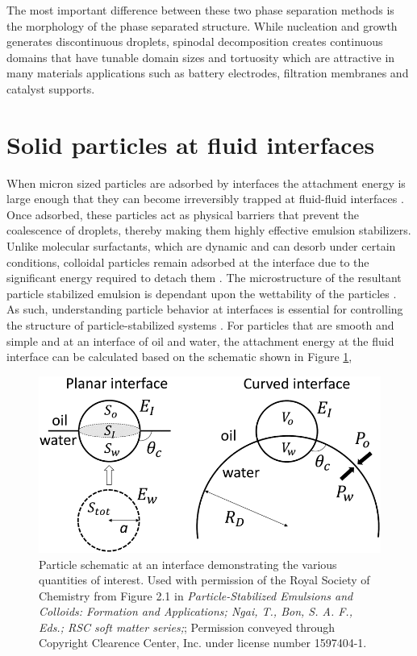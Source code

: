 The most important difference between these two phase separation methods is the morphology of the phase separated structure. While nucleation and growth generates discontinuous droplets,
spinodal decomposition creates continuous domains that have tunable domain sizes and tortuosity which are attractive in many materials applications such as battery electrodes, filtration
membranes and catalyst supports.

\section{Solid particles at fluid interfaces}

When micron sized particles are adsorbed by interfaces the attachment energy is large enough that they can become irreversibly trapped at fluid-fluid interfaces 
\cite{ngai_particle-stabilized_2015}. Once adsorbed, these particles act as physical barriers that prevent the coalescence of droplets, thereby making them highly effective 
emulsion stabilizers. Unlike molecular surfactants, which are dynamic and can desorb under certain conditions, colloidal particles remain adsorbed at the interface due to the 
significant energy required to detach them \cite{ngai_particle-stabilized_2015}. The microstructure of the resultant particle stabilized emulsion is dependant upon the wettability 
of the particles \cite{ngai_particle-stabilized_2015,velankar_non-equilibrium_2015}.
As such, understanding particle behavior at interfaces is essential for controlling the structure of particle-stabilized systems \cite{ngai_particle-stabilized_2015}. 
For particles that are smooth and simple and at an interface of oil and water, the attachment energy at the fluid interface can be calculated based on the schematic shown in 
Figure \ref{fig:pieranski_model},

\begin{figure}
    \centering
    \includegraphics[scale = 0.5]{../figures/literature_review/particle_at_interface.png }
    \caption{Particle schematic at an interface demonstrating the various quantities of interest. Used with permission of the Royal Society of Chemistry from 
             Figure 2.1 in \textit{Particle-Stabilized Emulsions and Colloids: Formation and Applications; Ngai, T., Bon, S. A. F., Eds.; RSC soft matter series;};
             Permission conveyed through Copyright Clearence Center, Inc. under license number 1597404-1.}
    \label{fig:pieranski_model}
\end{figure}

